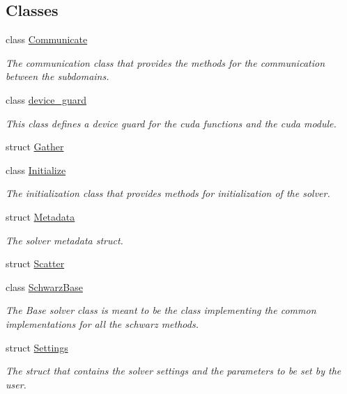\subsection*{Classes}
\begin{DoxyCompactItemize}
\item 
class \hyperlink{classschwz_1_1Communicate}{Communicate}
\begin{DoxyCompactList}\small\item\em The communication class that provides the methods for the communication between the subdomains. \end{DoxyCompactList}\item 
class \hyperlink{classschwz_1_1device__guard}{device\+\_\+guard}
\begin{DoxyCompactList}\small\item\em This class defines a device guard for the cuda functions and the cuda module. \end{DoxyCompactList}\item 
struct \hyperlink{structschwz_1_1Gather}{Gather}
\item 
class \hyperlink{classschwz_1_1Initialize}{Initialize}
\begin{DoxyCompactList}\small\item\em The initialization class that provides methods for initialization of the solver. \end{DoxyCompactList}\item 
struct \hyperlink{structschwz_1_1Metadata}{Metadata}
\begin{DoxyCompactList}\small\item\em The solver metadata struct. \end{DoxyCompactList}\item 
struct \hyperlink{structschwz_1_1Scatter}{Scatter}
\item 
class \hyperlink{classschwz_1_1SchwarzBase}{Schwarz\+Base}
\begin{DoxyCompactList}\small\item\em The Base solver class is meant to be the class implementing the common implementations for all the schwarz methods. \end{DoxyCompactList}\item 
struct \hyperlink{structschwz_1_1Settings}{Settings}
\begin{DoxyCompactList}\small\item\em The struct that contains the solver settings and the parameters to be set by the user. \end{DoxyCompactList}\item 

\end{DoxyCompactItemize}
